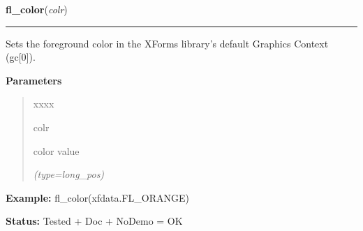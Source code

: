     \label{xformslib:flbasic:fl_color}

    \vspace{0.5ex}

\hspace{.8\funcindent}\begin{boxedminipage}{\funcwidth}

    \raggedright \textbf{fl\_color}(\textit{colr})

    \vspace{-1.5ex}

    \rule{\textwidth}{0.5\fboxrule}
\setlength{\parskip}{2ex}
    Sets the foreground color in the XForms library's default Graphics 
    Context (gc[0]).

\setlength{\parskip}{1ex}
      \textbf{Parameters}
      \vspace{-1ex}

      \begin{quote}
        \begin{Ventry}{xxxx}

          \item[colr]

          color value

            {\it (type=long\_pos)}

        \end{Ventry}

      \end{quote}

\textbf{Example:} fl\_color(xfdata.FL\_ORANGE)



\textbf{Status:} Tested + Doc + NoDemo = OK



    \end{boxedminipage}

    \label{xformslib:flbasic:fl_bk_color}

    \vspace{0.5ex}

